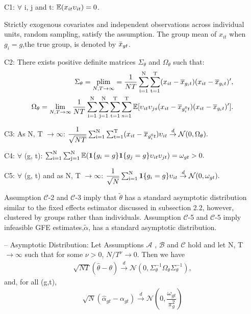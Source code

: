 \begin{assumption} C1: $\forall$ i, j and t: $\operatorname{\mathbb{E}}(x_{it}\upsilon_{it}) = 0$.
\end{assumption}
Strictly exogenous covariates and independent observations across individual units, random sampling, satisfy the assumption.
The group mean of $x_{it}$ when $g_i = g $,the true group, is denoted by $\Bar{x}_{gt}$.
\begin{assumption} C2: There exists positive definite matrices $\Sigma_\theta$ and $\Omega_\theta$ such that:
\begin{align*}
    \Sigma_\theta = \operatorname*{plim}_{N,T \rightarrow \infty} = \dfrac{1}{NT} \operatorname*{\sum_{i=1}^N} \operatorname*{\sum_{t=1}^T} (x_{it} - \overline{x}_{g_it})(x_{it} - \overline{x}_{g_it})',\\
\Omega_\theta = \lim_{N,T \rightarrow \infty} \dfrac{1}{NT} \operatorname*{\sum_{i=1}^N} \operatorname*{\sum_{j=1}^N} \operatorname*{\sum_{t=1}^T} \operatorname*{\sum_{s=1}^T} \operatorname{\mathbb{E}}[\upsilon_{it} \upsilon_{js}(x_{it} - \overline{x}_{g_i^0t})(x_{it} - \overline{x}_{g_it})'].
\end{align*}
\end{assumption}

\begin{assumption} C3: As N, T $\rightarrow \infty$: $\dfrac{1}{\sqrt{NT}} \operatorname*{\sum_{i=1}^N} \operatorname*{\sum_{t=1}^T} (x_{it} - \overline{x}_{g_i^0t})\upsilon_{it} \overset{d}{\to} \mathcal{N}(0,\Omega_\theta).$
\end{assumption}

\begin{assumption} C4: $\forall$ (g, t): $\operatorname*{\sum_{i=1}^N} \operatorname*{\sum_{j=1}^N} \operatorname{\mathbb{E}}(\textbf{1}\{g_i = g\}\textbf{1}\{g_j = g\}\upsilon_{it} \upsilon_{jt}) = \omega_{gt} > 0.$
\end{assumption}

\begin{assumption} C5: $\forall$ (g, t) and as N, T $\rightarrow \infty$: $\dfrac{1}{\sqrt{N}} \operatorname*{\sum_{i=1}^N} \textbf{1}\{g_i = g\}\upsilon_{it}   \overset{d}{\to} \mathcal{N}(0,\omega_{gt}).$
\end{assumption}

Assumption $\mathcal{C}$-2 and $\mathcal{C}$-3 imply that  $\tilde{\theta}$ has a standard asymptotic distribution similar to the fixed effects estimator discussed in subsection 2.2, however, clustered by groups rather than individuals. Assumption $\mathcal{C}$-5 and $\mathcal{C}$-5 imply infeasible GFE estimates,$\tilde{\alpha}$, has a standard asymptotic distribution.

\begin{corollary}-- Asymptotic Distribution: Let Assumptions   $\mathcal{A}$ , $\mathcal{B}$ and $\mathcal{C}$ hold and let N, T $\rightarrow \infty$ such that for some $\nu > 0$, $N/T^\nu \rightarrow 0$. Then we have
\begin{align}
    \sqrt{NT}(\hat\theta - \theta) \overset{d}{\to}  \mathcal{N}(0,\Sigma_\theta^{-1}\Omega_\theta\Sigma_\theta^{-1}),
\end{align}
and, for all (g,t),
\begin{align}
\sqrt{N}(\hat\alpha_{gt} - \alpha_{gt}) \overset{d}{\to}  \mathcal{N}(0, \dfrac{\omega_{gt}}{\pi_g^2})
\end{align}
\end{corollary}

